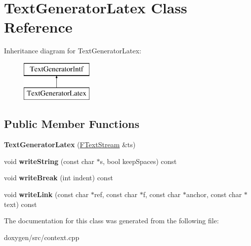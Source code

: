\hypertarget{class_text_generator_latex}{}\section{Text\+Generator\+Latex Class Reference}
\label{class_text_generator_latex}
Inheritance diagram for Text\+Generator\+Latex\+:\begin{figure}[H]
\begin{center}
\leavevmode
\includegraphics[height=2.000000cm]{class_text_generator_latex}
\end{center}
\end{figure}
\subsection*{Public Member Functions}
\begin{DoxyCompactItemize}
\item 
\mbox{\label{class_text_generator_latex_a731a5f464d83f8518962c623a62c777a}} 
{\bfseries Text\+Generator\+Latex} (\mbox{\hyperlink{class_f_text_stream}{F\+Text\+Stream}} \&ts)
\item 
\mbox{\label{class_text_generator_latex_add462a8fdd8f986f47d4666aa700f1c1}} 
void {\bfseries write\+String} (const char $\ast$s, bool keep\+Spaces) const
\item 
\mbox{\label{class_text_generator_latex_aa08da5ea0b1bb36859412755935f4cba}} 
void {\bfseries write\+Break} (int indent) const
\item 
\mbox{\label{class_text_generator_latex_aab600ff03e2612a2d67cbafa98591528}} 
void {\bfseries write\+Link} (const char $\ast$ref, const char $\ast$f, const char $\ast$anchor, const char $\ast$text) const
\end{DoxyCompactItemize}


The documentation for this class was generated from the following file\+:\begin{DoxyCompactItemize}
\item 
doxygen/src/context.\+cpp\end{DoxyCompactItemize}
